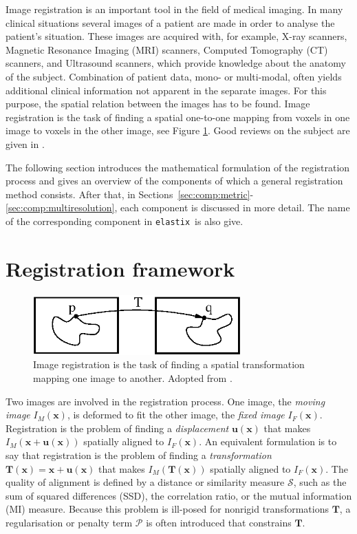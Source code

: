 \documentclass[]{report}
\newcommand{\elastix}{\texttt{elastix}}
\newcommand{\vx}{\bm{x}}
\newcommand{\vux}{\bm{u}(\bm{x})}
\newcommand{\vT}{\bm{T}}
\newcommand{\Sim}{\mathcal{S}}
\newcommand{\Pen}{\mathcal{P}}
\begin{document}
Image registration is an important tool in the field of medical
imaging. In many clinical situations several images of a patient are
made in order to analyse the patient's situation. These images are
acquired with, for example, X-ray scanners, Magnetic Resonance
Imaging (MRI) scanners, Computed Tomography (CT) scanners, and
Ultrasound scanners, which provide knowledge about the anatomy of the
subject. Combination of patient data, mono- or multi-modal, often
yields additional clinical information not apparent in the separate
images. For this purpose, the spatial relation between the images has
to be found. Image registration is the task of finding a spatial
one-to-one mapping from voxels in one image to voxels in the other
image, see Figure \ref{fig:concept}. Good reviews on the subject are
given in \citet{MaintzEA98,LesterEA99,HillEA01,Hajnal01}.

The following section introduces the mathematical formulation of the
registration process and gives an overview of the components of which
a general registration method consists. After that, in
Sections~\ref{sec:comp:metric}-\ref{sec:comp:multiresolution}, each
component is discussed in more detail. The name of the corresponding
component in \elastix\ is also give.

\section{Registration framework}\label{sec:framework}

\begin{figure}
\centering
\includegraphics[width=8cm]{ImageRegistrationConcept.eps}
\caption{Image registration is the task of finding a spatial
transformation mapping one image to another. Adopted from
\citet{ITKSoftwareGuideSecondEdition}.} \label{fig:concept}
\end{figure}

Two images are involved in the registration process. One image, the
\emph{moving image} $I_M(\vx)$, is deformed to fit the other image,
the \emph{fixed image} $I_F(\vx)$. Registration is the problem of
finding a \emph{displacement} $\vux$ that makes $I_M(\vx + \vux)$
spatially aligned to $I_F(\vx)$. An equivalent formulation is to say
that registration is the problem of finding a \emph{transformation}
$\vT(\vx) = \vx + \vux $ that makes $I_M(\vT(\vx))$ spatially aligned
to $I_F(\vx)$. The quality of alignment is defined by a distance or
similarity measure $\Sim$, such as the sum of squared differences
(SSD), the correlation ratio, or the mutual information (MI) measure.
Because this problem is ill-posed for nonrigid transformations $\vT$,
a regularisation or penalty term $\Pen$ is often introduced that
constrains $\vT$.
\end{document}
